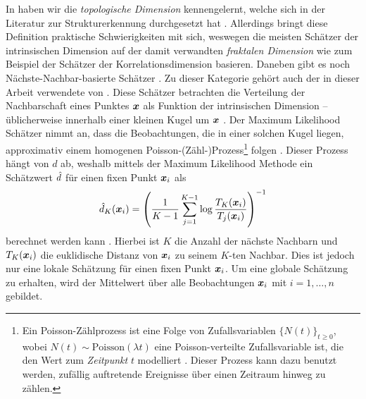 In  haben wir die \textit{topologische
	Dimension} kennengelernt, welche sich in der Literatur zur Strukturerkennung durchgesetzt hat \parencite[1]{Campadelli.2015}. Allerdings bringt diese Definition praktische Schwierigkeiten mit sich,
weswegen die meisten Schätzer der intrinsischen Dimension auf der damit verwandten
\textit{fraktalen Dimension} wie zum Beispiel der Schätzer der Korrelationsdimension \parencite{Camastra.2002} basieren. Daneben gibt es noch Nächste-Nachbar-basierte Schätzer \parencite[1]{Campadelli.2015}. Zu dieser Kategorie gehört auch der in dieser Arbeit verwendete
 von \textcite{Levina.2004}. Diese Schätzer betrachten die
Verteilung der Nachbarschaft eines Punktes $\bm{x}$ als Funktion der intrinsischen Dimension --
üblicherweise innerhalb einer kleinen Kugel um $\bm{x}$
\parencite[8]{Campadelli.2015}. Der Maximum Likelihood Schätzer nimmt an, dass die Beobachtungen, die
in einer solchen Kugel liegen, approximativ einem homogenen Poisson-(Zähl-)Prozess\footnote{Ein Poisson-Zählprozess ist eine Folge
von Zufallsvariablen $\{ N(t) \}_{t \geq 0}$, wobei $N(t) \sim \text{Poisson}(\lambda t)$ eine
Poisson-verteilte Zufallsvariable ist, die den Wert zum \textit{Zeitpunkt} $t$ modelliert \parencite[105 -- 117]{Jones.2018}. Dieser Prozess kann dazu benutzt werden, zufällig auftretende
Ereignisse über einen Zeitraum hinweg zu zählen.} folgen
\parencite[2]{Levina.2004}.
Dieser Prozess hängt von $d$ ab, weshalb mittels der Maximum Likelihood Methode ein Schätzwert
$\hat{d}$ für einen fixen Punkt $\bm{x}_i$ als
\begin{equation}
	\hat{d}_K(\bm{x}_i) = \left( \frac{1}{K - 1} \sum_{j=1}^{K - 1} \log \frac{T_K(\bm{x}_i)}{T_j(\bm{x}_i)} \right)^{-1}
\end{equation}
berechnet werden kann \parencite[4]{Levina.2004}. Hierbei ist $K$ die Anzahl der nächste Nachbarn und $T_{K}(\bm{x}_i)$ die
euklidische Distanz von $\bm{x}_i$ zu seinem $K$-ten Nachbar. Dies ist jedoch nur eine lokale
Schätzung für einen fixen Punkt $\bm{x}_i$. Um eine globale Schätzung zu erhalten, wird der
Mittelwert über alle Beobachtungen $\bm{x}_i$ mit $i = 1, \ldots, n$ gebildet.
